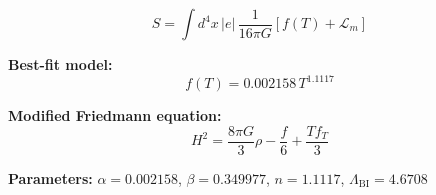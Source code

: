 
\begin{equation}
  S = \int d^4x \, |e| \, \frac{1}{16\pi G} \left[ f(T) + \mathcal{L}_m \right]
\end{equation}

\textbf{Best-fit model:}
\begin{equation}
  f(T) = 0.002158 \, T^{1.1117}
\end{equation}

\textbf{Modified Friedmann equation:}
\begin{equation}
  H^2 = \frac{8\pi G}{3} \rho - \frac{f}{6} + \frac{T f_T}{3}
\end{equation}

\textbf{Parameters:}
$\alpha = 0.002158$, \quad
$\beta = 0.349977$, \quad
$n = 1.1117$, \quad
$\Lambda_{\text{BI}} = 4.6708$